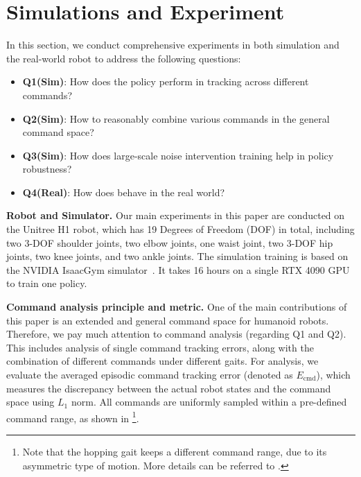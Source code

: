 \section{Simulations and Experiment}
In this section, we conduct comprehensive experiments in both simulation and the real-world robot to address the following questions:
\begin{itemize}[leftmargin=*]
    \item \textbf{Q1(Sim)}: How does the \our policy perform in tracking across different commands?
    \item  \textbf{Q2(Sim)}: How to reasonably combine various commands in the general command space? %
    \item \textbf{Q3(Sim)}: How does large-scale noise intervention training help in policy robustness? %
    \item \textbf{Q4(Real)}: How does \our behave in the real world? %
\end{itemize}

\noindent\textbf{Robot and Simulator.} 
Our main experiments in this paper are conducted on the Unitree H1 robot, which has 19 Degrees of Freedom (DOF) in total, including 
two 3-DOF shoulder joints, two elbow joints, one waist joint, two 3-DOF hip joints, two knee joints, and two ankle joints.
The simulation training is based on the NVIDIA IsaacGym simulator~\citep{makoviychuk2021isaac}. It takes 16 hours on a single RTX 4090 GPU to train one policy.

\noindent\textbf{Command analysis principle and metric.}
One of the main contributions of this paper is an extended and general command space for humanoid robots. Therefore, we pay much attention to command analysis (regarding Q1 and Q2). This includes analysis of single command tracking errors, along with the combination of different commands under different gaits.
For analysis, we evaluate the averaged episodic command tracking error (denoted as $E_\text{cmd}$), which measures the discrepancy between the actual robot states and the command space using $L_1$ norm.
All commands are uniformly sampled within a pre-defined command range, as shown in \footnote{Note that the hopping gait keeps a different command range, due to its asymmetric type of motion. More details can be referred to .}.

